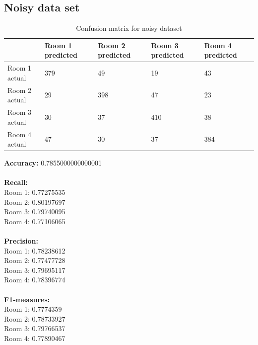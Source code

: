\documentclass[a4paper, 11pt]{article}
\begin{document}
    
    \subsection{Noisy data set}
    \renewcommand{\arraystretch}{2}  
    \begin{table}[htb]
      \centering
      \caption{Confusion matrix for noisy dataset}
      \begin{tabular}{|l|l|l|l|l|}
      \hline
                    & Room 1 predicted & Room 2 predicted & Room 3 predicted & Room 4 predicted \\ \hline
      Room 1 actual & 379              & 49               & 19               & 43               \\ \hline
      Room 2 actual & 29               & 398              & 47               & 23               \\ \hline
      Room 3 actual & 30               & 37               & 410              & 38               \\ \hline
      Room 4 actual & 47               & 30               & 37               & 384              \\ \hline
      \end{tabular}
    \end{table}
    \textbf{Accuracy:} 0.7855000000000001 \\
    \\
    \textbf{Recall:} \\
    Room 1: 0.77275535 \\
    Room 2: 0.80197697 \\
    Room 3: 0.79740095 \\
    Room 4: 0.77106065 \\
    \\
    \textbf{Precision:} \\
    Room 1: 0.78238612 \\
    Room 2: 0.77477728 \\
    Room 3: 0.79695117 \\
    Room 4: 0.78396774 \\
    \\
    \textbf{F1-measures:} \\
    Room 1: 0.7774359 \\
    Room 2: 0.78733927  \\
    Room 3: 0.79766537 \\
    Room 4: 0.77890467 \\
    
\pagebreak
\end{document}
